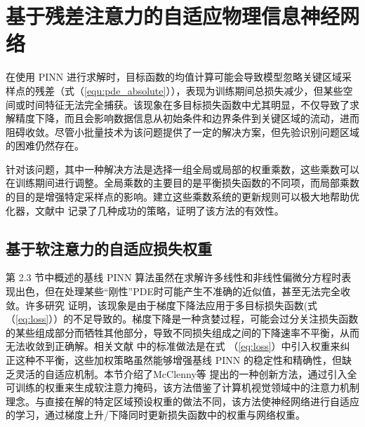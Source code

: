 \chapter{基于残差注意力的自适应物理信息神经网络}

在使用 PINN 进行求解时，目标函数的均值计算可能会导致模型忽略关键区域采样点的残差（式（\ref{equ:pde_absolute}）），表现为训练期间总损失减少，但某些空间或时间特征无法完全捕获。该现象在多目标损失函数中尤其明显，不仅导致了求解精度下降，而且会影响数据信息从初始条件和边界条件到关键区域的流动，进而阻碍收敛。尽管小批量技术为该问题提供了一定的解决方案，但先验识别问题区域的困难仍然存在。

针对该问题，其中一种解决方法是选择一组全局或局部的权重乘数，这些乘数可以在训练期间进行调整。全局乘数的主要目的是平衡损失函数的不同项，而局部乘数的目的是增强特定采样点的影响。建立这些乘数系统的更新规则可以极大地帮助优化器，文献中 \cite{wang2021understanding,wang2022and,liu2021dual,mcclenny2020self,xiang2022self}记录了几种成功的策略，证明了该方法的有效性。

\section{基于软注意力的自适应损失权重}

第 2.3 节中概述的基线 PINN 算法虽然在求解许多线性和非线性偏微分方程时表现出色，但在处理某些“刚性”PDE时可能产生不准确的近似值，甚至无法完全收敛。许多研究 \cite{wang2021understanding,wang2022and}证明，该现象是由于梯度下降法应用于多目标损失函数(式 （\ref{eq:loss}））的不足导致的。梯度下降是一种贪婪过程，可能会过分关注损失函数的某些组成部分而牺牲其他部分，导致不同损失组成之间的下降速率不平衡，从而无法收敛到正确解。相关文献 \cite{wang2021understanding,wang2022and}中的标准做法是在式 （\ref{eq:loss}）中引入权重来纠正这种不平衡，这些加权策略虽然能够增强基线 PINN 的稳定性和精确性，但缺乏灵活的自适应机制。本节介绍了McClenny等 \cite{mcclenny2020self}提出的一种创新方法，通过引入全可训练的权重来生成软注意力掩码，该方法借鉴了计算机视觉领域中的注意力机制理念\cite{vaswani2017attention}。与直接在解的特定区域预设权重的做法不同，该方法使神经网络进行自适应的学习，通过梯度上升/下降同时更新损失函数中的权重与网络权重。

